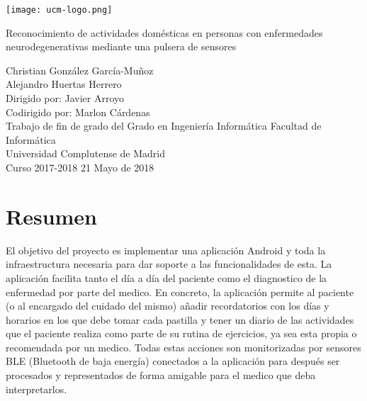 \documentclass[11pt,spanish]{article}
\author{
\Large Christian González García-Muñoz \\ 
\Large Alejandro Huertas Herrero 
}
\date{}
\begin{document}
\begin{titlepage}
	\centering
    \texttt{[image: ucm-logo.png]}
    \vskip 1cm
    
    \centering
    {\huge Reconocimiento de actividades domésticas en personas con enfermedades neurodegenerativas mediante una pulsera de sensores 
    }
    \newline
    \newline
    \newline
    \newline
    
	\centering \large { Christian González García-Muñoz \\  Alejandro Huertas Herrero \\ 
    					\bigskip Dirigido por: Javier Arroyo \\ Codirigido por: Marlon Cárdenas \\ \bigskip}
    \vskip 1cm
    \centering \Large { Trabajo de fin de grado del Grado en Ingeniería Informática }
	\vskip 1cm
    \centering \large {Facultad de Informática \\ Universidad Complutense de Madrid \\ Curso 2017-2018}
    \vskip 0.5cm
    \centering \large {21 Mayo de 2018}

\end{titlepage}
\clearpage
\vphantom{a}
\newpage


\section*{Resumen}
El objetivo del proyecto es implementar una aplicación Android y toda la infraestructura necesaria para dar soporte a las funcionalidades de esta. La aplicación facilita tanto el día a día del paciente como el diagnostico de la enfermedad por parte del medico. En concreto, la aplicación permite al paciente (o al encargado del cuidado del mismo) añadir recordatorios con los días y horarios en los que debe tomar cada pastilla y tener un diario de las actividades que el paciente realiza como parte de su rutina de ejercicios, ya sea esta propia o recomendada por un medico. Todas estas acciones son monitorizadas por sensores BLE (Bluetooth de baja energía) conectados a la aplicación para después ser procesados y representados de forma amigable para el medico que deba interpretarlos. 
\newline
\end{document}
